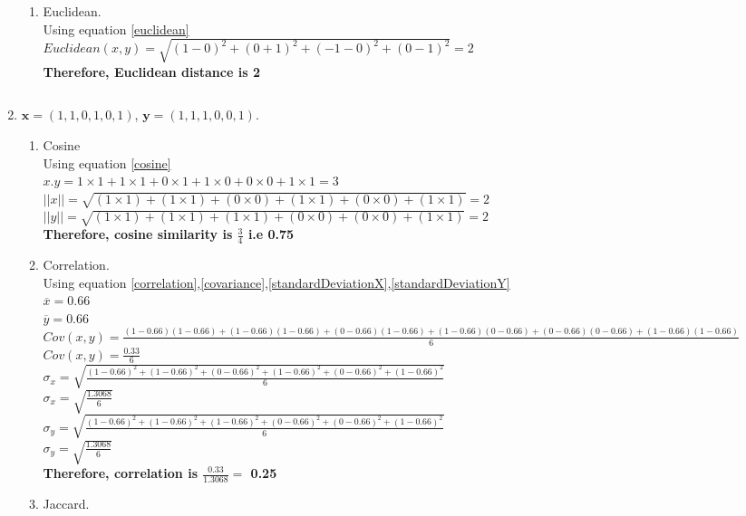 \documentclass{article}
\begin{document}
\begin{enumerate}
\begin{enumerate}
        \item Euclidean.\\
        Using equation \ref{euclidean}\\
        $Euclidean(x,y) = \sqrt{(1-0)^2+(0+1)^2+(-1-0)^2+(0-1)^2} = 2$\\
        \textbf{Therefore, Euclidean distance is 2}\\
        \end{enumerate}
        $$$$
    \item $\textbf{x} = (1,1,0,1,0,1)$, $\textbf{y} = (1,1,1,0,0,1)$.\\
        \begin{enumerate}
        \item Cosine\\
        Using equation \ref{cosine}\\
        $x.y = 1\times1 + 1\times1 + 0\times1 +  1\times0 + 0\times0 +1\times1 = 3$\\
        $||x|| = \sqrt{(1\times1)+(1\times1)+(0\times0)+(1\times1)+(0\times0)+(1\times1)} = 2$\\
        $||y|| = \sqrt{(1\times1)+(1\times1)+(1\times1)+(0\times0)+(0\times0)+(1\times1)} = 2$\\
        \textbf{Therefore, cosine similarity is $\frac{3}{4}$ i.e 0.75}
        \item Correlation.\\
        Using equation \ref{correlation},\ref{covariance},\ref{standardDeviationX},\ref{standardDeviationY}\\
        $\overline{x} = 0.66$ \\
        $\overline{y} = 0.66$\\
        $Cov(x,y) = \frac{(1-0.66)(1-0.66)+(1-0.66)(1-0.66)+(0-0.66)(1-0.66)+(1-0.66)(0-0.66)+(0-0.66)(0-0.66)+(1-0.66)(1-0.66)}{6}$\\
        $Cov(x,y) = \frac{0.33}{6}$\\
        $\sigma_x = \sqrt{\frac{(1-0.66)^2+(1-0.66)^2+(0-0.66)^2+(1-0.66)^2+(0-0.66)^2+(1-0.66)^2}{6}}$\\
        $\sigma_x = \sqrt{\frac{1.3068}{6}}$\\
        $\sigma_y = \sqrt{\frac{(1-0.66)^2+(1-0.66)^2+(1-0.66)^2+(0-0.66)^2+(0-0.66)^2+(1-0.66)^2}{6}}$\\
        $\sigma_y = \sqrt{\frac{1.3068}{6}}$\\
        \textbf{Therefore, correlation is $\frac{0.33}{1.3068} =$ 0.25}\\
        \item Jaccard.\\

\end{enumerate}
\end{enumerate}
\end{document}
